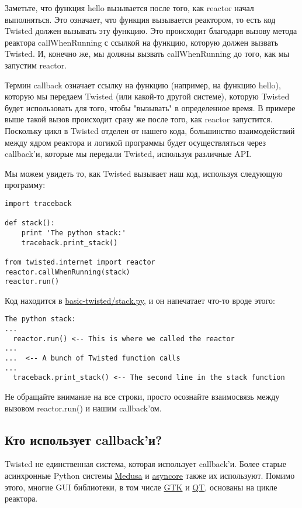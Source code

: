 Заметьте, что функция hello вызывается после того, как reactor 
начал выполняться. Это означает, что функция вызывается 
реактором, то есть код Twisted должен вызывать эту функцию. 
Это происходит благодаря вызову метода реактора callWhenRunning с 
ссылкой на функцию, которую должен вызвать Twisted. И, конечно же, 
мы должны вызвать callWhenRunning до того, как мы запустим 
reactor.


Термин callback означает ссылку на функцию (например, на 
функцию hello), которую мы 
передаем Twisted (или какой-то другой системе), 
которую Twisted будет использовать для того, чтобы "вызывать"  
в определенное время. В примере выше такой вызов происходит 
сразу же после того, как reactor запустится. Поскольку 
цикл в Twisted отделен от нашего кода, большинство 
взаимодействий между ядром реактора и логикой программы 
будет осуществляться через callback'и, которые 
мы передали Twisted, используя различные API.   


Мы можем увидеть то, как Twisted вызывает наш код, 
используя следующую программу:

 \begin{verbatim}
import traceback

def stack():
    print 'The python stack:'
    traceback.print_stack()

from twisted.internet import reactor
reactor.callWhenRunning(stack)
reactor.run()
\end{verbatim} 


Код находится в 
\href{http://github.com/jdavisp3/twisted-intro/blob/master/basic-twisted/stack.py}{basic-twisted/stack.py}, 
и он напечатает что-то вроде этого:

 \begin{verbatim}
The python stack:
...
  reactor.run() <-- This is where we called the reactor
...
...  <-- A bunch of Twisted function calls
...
  traceback.print_stack() <-- The second line in the stack function
\end{verbatim} 


Не обращайте внимание на все строки, просто 
осознайте взаимосвязь между вызовом  reactor.run() и 
нашим callback'ом. 


\subsection{Кто использует callback'и?}

Twisted не единственная система, которая использует callback'и. 
Более старые асинхронные Python системы 
\href{http://www.nightmare.com/medusa/}{Medusa} и 
\href{http://docs.python.org/library/asyncore.html#module-asyncore}{asyncore} 
также их используют. Помимо этого, многие GUI библиотеки, в том числе    
\href{http://gtk.org/}{GTK} и \href{http://qt.nokia.com/}{QT}, 
основаны на цикле реактора.


